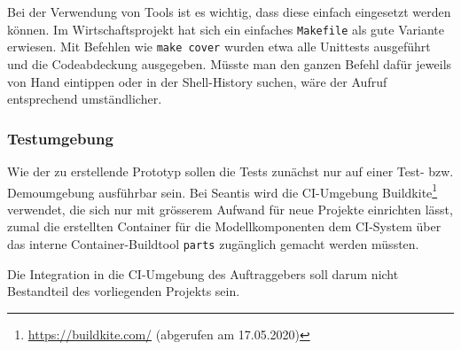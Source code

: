 Bei der Verwendung von Tools ist es wichtig, dass diese einfach eingesetzt werden können. Im Wirtschaftsprojekt hat sich ein einfaches \texttt{Makefile} als gute Variante erwiesen. Mit Befehlen wie \texttt{make cover} wurden etwa alle Unittests ausgeführt und die Codeabdeckung ausgegeben. Müsste man den ganzen Befehl dafür jeweils von Hand eintippen oder in der Shell-History suchen, wäre der Aufruf entsprechend umständlicher.

\subsubsection{Testumgebung}

Wie der zu erstellende Prototyp sollen die Tests zunächst nur auf einer Test- bzw. Demoumgebung ausführbar sein. Bei Seantis wird die CI-Umgebung Buildkite\footnote{\url{https://buildkite.com/} (abgerufen am 17.05.2020)} verwendet, die sich nur mit grösserem Aufwand für neue Projekte einrichten lässt, zumal die erstellten Container für die Modellkomponenten dem CI-System über das interne Container-Buildtool \texttt{parts} zugänglich gemacht werden müssten.

Die Integration in die CI-Umgebung des Auftraggebers soll darum nicht Bestandteil des vorliegenden Projekts sein.
